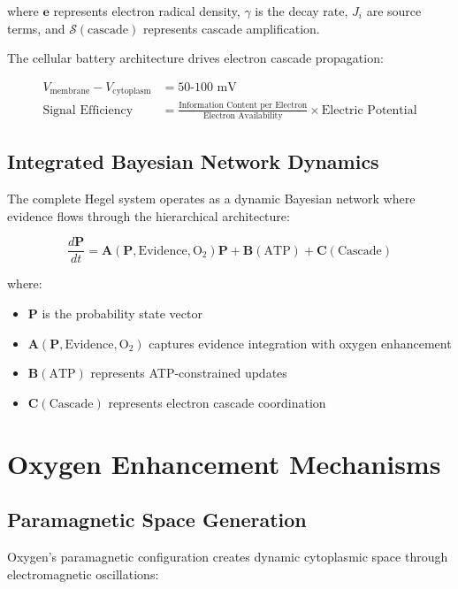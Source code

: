 \documentclass[12pt,a4paper]{article}
\begin{document}
where $\mathbf{e}$ represents electron radical density, $\gamma$ is the decay rate, $J_i$ are source terms, and $\mathcal{S}(\text{cascade})$ represents cascade amplification.

The cellular battery architecture drives electron cascade propagation:

\begin{align}
V_{\text{membrane}} - V_{\text{cytoplasm}} &= 50\text{-}100 \text{ mV} \\
\text{Signal Efficiency} &= \frac{\text{Information Content per Electron}}{\text{Electron Availability}} \times \text{Electric Potential}
\end{align}

\subsection{Integrated Bayesian Network Dynamics}

The complete Hegel system operates as a dynamic Bayesian network where evidence flows through the hierarchical architecture:

\begin{equation}
\frac{d\mathbf{P}}{dt} = \mathbf{A}(\mathbf{P}, \text{Evidence}, \text{O}_2) \mathbf{P} + \mathbf{B}(\text{ATP}) + \mathbf{C}(\text{Cascade})
\end{equation}

where:
\begin{itemize}
\item $\mathbf{P}$ is the probability state vector
\item $\mathbf{A}(\mathbf{P}, \text{Evidence}, \text{O}_2)$ captures evidence integration with oxygen enhancement
\item $\mathbf{B}(\text{ATP})$ represents ATP-constrained updates
\item $\mathbf{C}(\text{Cascade})$ represents electron cascade coordination
\end{itemize}

\section{Oxygen Enhancement Mechanisms}

\subsection{Paramagnetic Space Generation}

Oxygen's paramagnetic configuration creates dynamic cytoplasmic space through electromagnetic oscillations:
\end{document}
